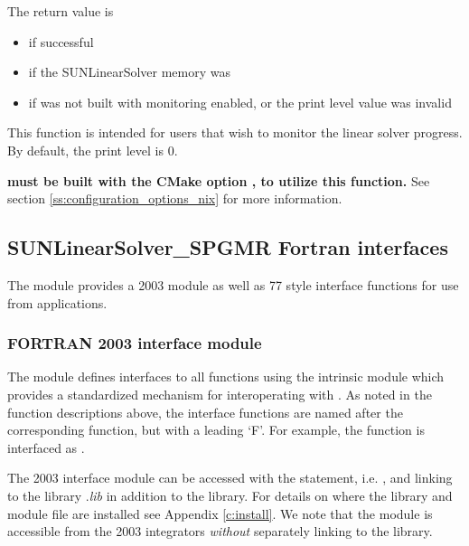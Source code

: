 {
  The return value is
  \begin{itemize}
    \item {} if successful
    \item {} if the SUNLinearSolver memory was 
    \item {} if {\sundials} was not built with monitoring enabled,
      or the print level value was invalid
  \end{itemize}
}
{
  This function is intended for users that wish to monitor the linear
  solver progress. By default, the print level is 0.

  \textbf{{\sundials} must be built with the CMake option
  , to utilize this function.}
  See section \ref{ss:configuration_options_nix} for more information.
}


\subsection{SUNLinearSolver\_SPGMR Fortran interfaces}
\label{ss:sunlinsol_spgmr_fortran}

The {\sunlinsolspgmr} module provides a {\F} 2003 module as well as {\F} 77
style interface functions for use from {\F} applications.

\subsubsection*{FORTRAN 2003 interface module}
The  {\F} module defines interfaces to all
{\sunlinsolspgmr} {\CC} functions using the intrinsic 
module which provides a standardized mechanism for interoperating with {\CC}. As
noted in the {\CC} function descriptions above, the interface functions are
named after the corresponding {\CC} function, but with a leading `F'. For
example, the function  is interfaced as
.

The {\F} 2003 {\sunlinsolspgmr} interface module can be accessed with the 
statement, i.e. , and linking to the library
.{\em lib} in addition to the {\CC} library.
For details on where the library and module file
 are installed see Appendix \ref{c:install}.
We note that the module is accessible from the {\F} 2003 {\sundials} integrators
\textit{without} separately linking to the
 library.

